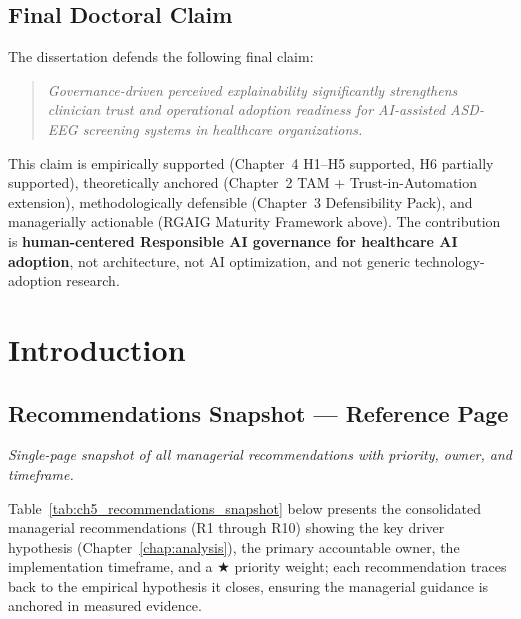 \subsection*{Final Doctoral Claim}
\label{sec:ch5_final_claim}

\noindent The dissertation defends the following final claim:

\begin{quote}
\emph{Governance-driven perceived explainability significantly strengthens clinician trust and operational adoption readiness for AI-assisted ASD-EEG screening systems in healthcare organizations.}
\end{quote}

\noindent This claim is empirically supported (Chapter~4 H1--H5 supported, H6 partially supported), theoretically anchored (Chapter~2 TAM + Trust-in-Automation extension), methodologically defensible (Chapter~3 Defensibility Pack), and managerially actionable (RGAIG Maturity Framework above). The contribution is \textbf{human-centered Responsible AI governance for healthcare AI adoption}, not architecture, not AI optimization, and not generic technology-adoption research.

\section{Introduction}

\subsection{Recommendations Snapshot --- Reference Page}
\label{sec:ch5_recommendations_snapshot}

\noindent\emph{Single-page snapshot of all managerial recommendations with priority, owner, and timeframe.}

\noindent Table~\ref{tab:ch5_recommendations_snapshot} below presents the consolidated managerial recommendations (R1 through R10) showing the key driver hypothesis (Chapter~\ref{chap:analysis}), the primary accountable owner, the implementation timeframe, and a $\bigstar$ priority weight; each recommendation traces back to the empirical hypothesis it closes, ensuring the managerial guidance is anchored in measured evidence.

